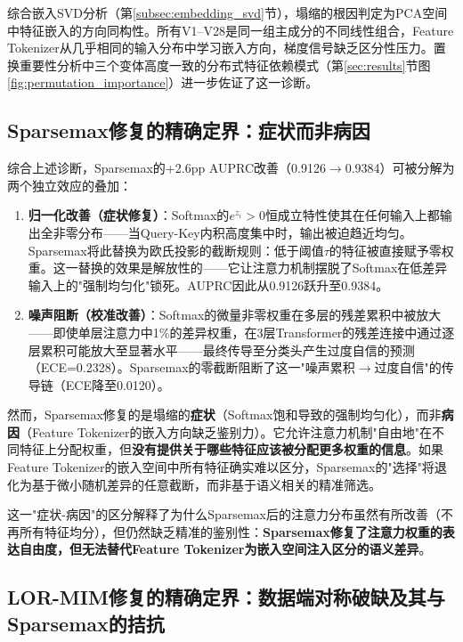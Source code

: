 综合嵌入SVD分析（第\ref{subsec:embedding_svd}节），塌缩的根因判定为PCA空间中特征嵌入的方向同构性。所有V1--V28是同一组主成分的不同线性组合，Feature Tokenizer从几乎相同的输入分布中学习嵌入方向，梯度信号缺乏区分性压力。置换重要性分析中三个变体高度一致的分布式特征依赖模式（第\ref{sec:results}节图\ref{fig:permutation_importance}）进一步佐证了这一诊断。

\subsection{Sparsemax修复的精确定界：症状而非病因}

综合上述诊断，Sparsemax的+2.6pp AUPRC改善（0.9126$\to$0.9384）可被分解为两个独立效应的叠加：

\begin{enumerate}
    \item \textbf{归一化改善（症状修复）}：Softmax的$e^{z_i} > 0$恒成立特性使其在任何输入上都输出全非零分布——当Query-Key内积高度集中时，输出被迫趋近均匀。Sparsemax将此替换为欧氏投影的截断规则：低于阈值$\tau$的特征被直接赋予零权重。这一替换的效果是解放性的——它让注意力机制摆脱了Softmax在低差异输入上的"强制均匀化"锁死。AUPRC因此从0.9126跃升至0.9384。
    \item \textbf{噪声阻断（校准改善）}：Softmax的微量非零权重在多层的残差累积中被放大——即使单层注意力中1\%的差异权重，在3层Transformer的残差连接中通过逐层累积可能放大至显著水平——最终传导至分类头产生过度自信的预测（ECE=0.2328）。Sparsemax的零截断阻断了这一"噪声累积$\to$过度自信"的传导链（ECE降至0.0120）。
\end{enumerate}

然而，Sparsemax修复的是塌缩的\textbf{症状}（Softmax饱和导致的强制均匀化），而非\textbf{病因}（Feature Tokenizer的嵌入方向缺乏鉴别力）。它允许注意力机制"自由地"在不同特征上分配权重，但\textbf{没有提供关于哪些特征应该被分配更多权重的信息}。如果Feature Tokenizer的嵌入空间中所有特征确实难以区分，Sparsemax的"选择"将退化为基于微小随机差异的任意截断，而非基于语义相关的精准筛选。

这一"症状-病因"的区分解释了为什么Sparsemax后的注意力分布虽然有所改善（不再所有特征均分），但仍然缺乏精准的鉴别性：\textbf{Sparsemax修复了注意力权重的表达自由度，但无法替代Feature Tokenizer为嵌入空间注入区分的语义差异}。

\subsection{LOR-MIM修复的精确定界：数据端对称破缺及其与Sparsemax的拮抗}

